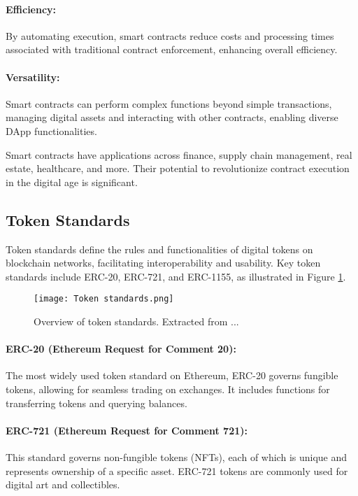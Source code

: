 \paragraph{Efficiency:}
By automating execution, smart contracts reduce costs and processing times
associated with traditional contract enforcement, enhancing overall efficiency.

\paragraph{Versatility:}
Smart contracts can perform complex functions beyond simple transactions,
managing digital assets and interacting with other contracts, enabling diverse
DApp functionalities.

Smart contracts have applications across finance, supply chain management, real
estate, healthcare, and more. Their potential to revolutionize contract
execution in the digital age is significant.

\subsection{Token Standards}
\label{subsec:token_standards}

Token standards define the rules and functionalities of digital tokens on
blockchain networks, facilitating interoperability and usability. Key token
standards include ERC-20, ERC-721, and ERC-1155, as illustrated in Figure
\ref{fig:token_standards}.

\begin{figure}[H]
    \centering
    \texttt{[image: Token standards.png]}
    \caption[Token standards]{Overview of token standards. Extracted from ...}
    \label{fig:token_standards}
\end{figure}

\paragraph{ERC-20 (Ethereum Request for Comment 20):}
The most widely used token standard on Ethereum, ERC-20 governs fungible
tokens, allowing for seamless trading on exchanges. It includes functions for
transferring tokens and querying balances.

\paragraph{ERC-721 (Ethereum Request for Comment 721):}
This standard governs non-fungible tokens (NFTs), each of which is unique and
represents ownership of a specific asset. ERC-721 tokens are commonly used for
digital art and collectibles.

